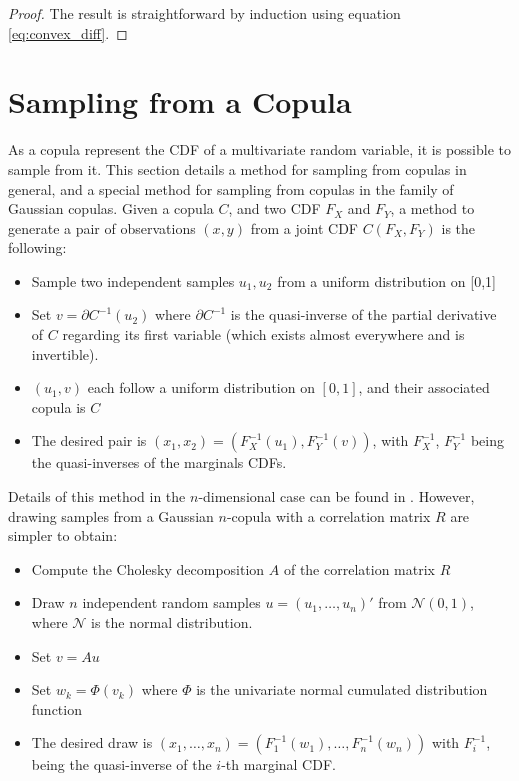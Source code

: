\begin{proof}
    The result is straightforward by induction using equation \eqref{eq:convex_diff}.
\end{proof}

\section{Sampling from a Copula}
As a copula represent the CDF of a multivariate random variable, it is possible to sample from it. This section details a method for sampling from copulas in general, and a special method for sampling from copulas in the family of Gaussian copulas. Given a copula $C$, and two CDF $F_X$ and $F_Y$, a method to generate a pair of observations $(x, y)$ from a joint CDF $C(F_X, F_Y)$ is the following:

\begin{itemize}
    \item Sample two independent samples $u_1, u_2$ from a uniform distribution on [0,1]
    \item Set $v=\partial C^{-1}(u_2)$ where $\partial C^{-1}$ is the quasi-inverse of the partial derivative of $C$ regarding its first variable (which exists almost everywhere and is invertible).
    \item $(u_1, v)$ each follow a uniform distribution on $[0,1]$, and their associated copula is $C$ 
    \item The desired pair is $(x_1,x_2) = (F^{-1}_X(u_1), F^{-1}_Y(v))$, with $F_X^{-1}$, $F_Y^{-1}$ being the quasi-inverses of the marginals CDFs.
\end{itemize}

Details of this method in the $n$-dimensional case can be found in \cite{cherubini_copula_2004}. However, drawing samples from a Gaussian $n$-copula with a correlation matrix $R$ are simpler to obtain:
\begin{itemize}
    \item Compute the Cholesky decomposition $A$ of the correlation matrix $R$
    \item Draw $n$ independent random samples $u=(u_1, \dots, u_n)'$ from $\mathcal{N}(0,1)$, where $\mathcal{N}$ is the normal distribution.
    \item Set $v=Au$
    \item Set $w_k=\Phi(v_k)$ where $\Phi$ is the univariate normal cumulated distribution function
    \item The desired draw is $(x_1,\dots, x_n)=(F^{-1}_1(w_1), \dots, F^{-1}_n(w_n))$ with $F_i^{-1}$, being the quasi-inverse of the $i$-th marginal CDF.
\end{itemize}

